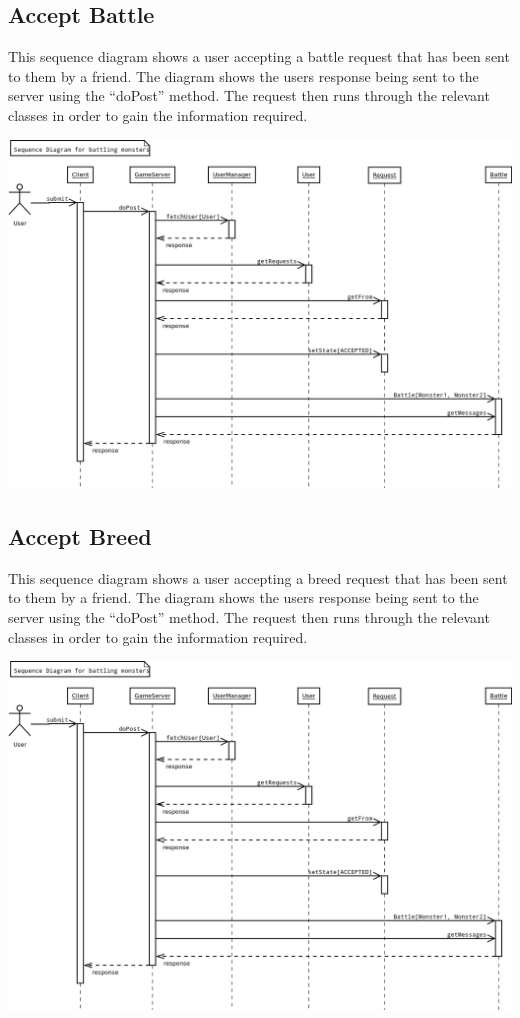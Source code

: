 \documentclass{project}
\begin{document}
\subsection{Accept Battle}
This sequence diagram shows a user accepting a battle request that has been sent to them by a friend. The diagram shows the users response being sent to the server using the “doPost” method. The request then runs through the relevant classes in order to gain the information required.
\begin{center}
\includegraphics[scale=0.40]{SD_accept_battle.png}
\end{center}

\subsection{Accept Breed}
This sequence diagram shows a user accepting a breed request that has been sent to them by a friend. The diagram shows the users response being sent to the server using the “doPost” method. The request then runs through the relevant classes in order to gain the information required.
\begin{center}
\includegraphics[scale=0.40]{SD_accept_breed.png}
\end{center}
\end{document}
